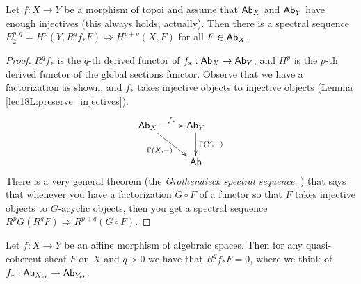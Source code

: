 
 

 \begin{lemma}
   Let $f:X\to Y$ be a morphism of topoi and assume that $\text{\sf Ab}_X$ and $\text{\sf Ab}_Y$ have
   enough injectives (this always holds, actually). Then there is a spectral sequence
   $E^{p,q}_2=H^p(Y,R^q\!f_*F)\Rightarrow H^{p+q}(X,F)$ for all $F\in \text{\sf Ab}_X$.
 \end{lemma}
 \begin{proof}
   $R^q\!f_*$ is the $q$-th derived functor of $f_*:\text{\sf Ab}_X\to \text{\sf Ab}_Y$, and $H^p$ is the
   $p$-th derived functor of the global sections functor. Observe that we have a
   factorization as shown, and $f_*$ takes injective objects to injective objects (Lemma
   \ref{lec18L:preserve_injectives}).
   \[\xymatrix{
    \ab_X \ar[r]^{f_*} \ar[dr]_{\Ga(X,-)} & \ab_Y \ar[d]^{\Ga(Y,-)}\\
    & \ab
   }\]
    There is a very general theorem (the \emph{Grothendieck spectral sequence},
   \cite[XX.9.6]{Lang:Algebra}) that says that whenever you have a factorization $G\circ
   F$ of a functor so that $F$ takes injective objects to $G$-acyclic objects, then you
   get a spectral sequence $R^pG(R^qF)\Rightarrow R^{p+q}(G\circ F)$.
 \end{proof}
 \begin{lemma}
   Let $f:X\to Y$ be an affine morphism of algebraic spaces. Then for any quasi-coherent
   sheaf $F$ on $X$ and $q>0$ we have that $R^q\!f_*F=0$, where we think of
   $f_*:\text{\sf Ab}_{X_{et}}\to \text{\sf Ab}_{Y_{et}}$.
 \end{lemma}
